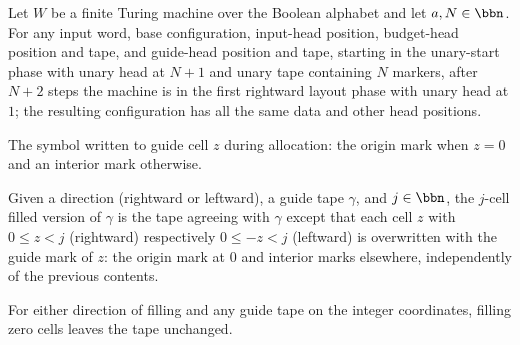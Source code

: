 \begin{lemma}
\label{Complexity.setupCfg_unary_start}
\leanok
{}
Let $W$ be a finite Turing machine over the Boolean alphabet and let $a,N\in\bbn$. For
any input word, base configuration, input-head position, budget-head position and tape,
and guide-head position and tape, starting in the unary-start phase with unary head at
$N+1$ and unary tape containing $N$ markers, after $N+2$ steps the machine is in the
first rightward layout phase with unary head at $1$; the resulting configuration has all
the same data and other head positions.
\end{lemma}

\begin{definition}
\label{Complexity.guideMark}
\leanok
{}
The symbol written to guide cell $z$ during allocation: the origin mark when $z = 0$
and an interior mark otherwise.
\end{definition}

\begin{definition}
\label{Complexity.guideFill}
\leanok
{}
Given a direction (rightward or leftward), a guide tape $\gamma$, and $j \in \bbn$, the
$j$-cell filled version of $\gamma$ is the tape agreeing with $\gamma$ except that each
cell $z$ with $0 \le z < j$ (rightward) respectively $0 \le -z < j$ (leftward) is
overwritten with the guide mark of $z$: the origin mark at $0$ and interior marks
elsewhere, independently of the previous contents.
\end{definition}

\begin{lemma}
\label{Complexity.guideFill_zero}
\leanok
{}
For either direction of filling and any guide tape on the integer coordinates, filling
zero cells leaves the tape unchanged.
\end{lemma}

